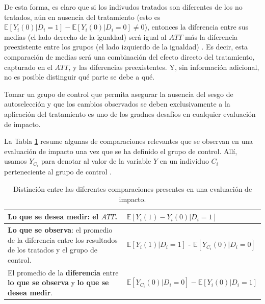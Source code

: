 \documentclass[../../main.tex]{subfiles}
\begin{document}
De esta forma, es claro que si los indivudos tratados son diferentes de los no tratados,
aún en ausencia del tratamiento (esto es \(\mathbb{E} \left[Y_i(0)|D_i=1\right] -
\mathbb{E} \left[Y_i(0)|D_i=0\right] \neq 0\)), entonces la diferencia entre sus medias
(el lado derecho de la igualdad) será igual al \(ATT\) más la diferencia preexistente
entre los grupos (el lado izquierdo de la igualdad) \cite{bernal}. Es decir, esta
comparación de medias será una combinación del efecto directo del tratamiento, capturado
en el \(ATT\), y las diferencias preexistentes. Y, sin información adicional, no es
posible distinguir qué parte se debe a qué.

Tomar un grupo de control que permita asegurar la ausencia del sesgo de autoselección y
que los cambios observados se deben exclusivamente a la aplicación del tratamiento es uno
de los gradnes desafíos en cualquier evaluación de impacto.


\bigskip
La Tabla \ref{tab:distinciones} resume algunas de comparaciones relevantes que se observan
en una evaluación de impacto una vez que se ha definido el grupo de control. Allí, usamos
\(Y_{C_i}\) para denotar al valor de la variable \(Y\) en un individuo \(C_i\)
perteneciente al grupo de control .
\begin{table}[ht]
    \centering
    \begin{tabular}{p{7cm}m{7cm}}  %
        \hline
        \textbf{Lo que se desea medir}: el \(ATT\).
            & \(\mathbb{E} \left[Y_i(1)-Y_i(0)|D_i=1\right]\)
            \\
        \hline
        \textbf{Lo que se observa}: el promedio de la diferencia entre los resultados de
        los tratados y el grupo de control.
            & \(\mathbb{E} \left[Y_i(1)|D_i=1\right]\) - \(\mathbb{E} \left[Y_{C_i}(0)|D_i=0\right]\)
            \\
        \hline
        El promedio de la \textbf{diferencia} entre \textbf{lo que se observa} y
        \textbf{lo que se desea medir}.
            & \(\mathbb{E} \left[Y_{C_i}(0)|D_i=0\right] - \mathbb{E}\left[Y_i(0)|D_i=1\right]\)
        \\
        \hline
    \end{tabular}
    \caption{Distinción entre las diferentes comparaciones presentes en una evaluación de impacto.}
    \label{tab:distinciones}
\end{table}
\end{document}
